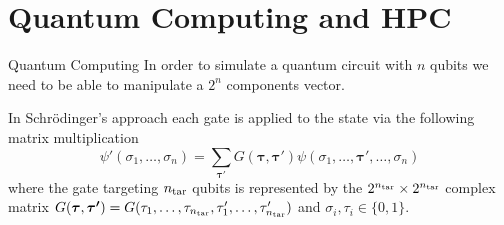 \documentclass[11p,aspectratio=169]{beamer}
\begin{document}
\section{Quantum Computing and HPC}

\begin{frame}{Quantum Computing}
    In order to simulate a quantum circuit with $n$ qubits we need to be able to manipulate a $2^n$ components
    vector.

    In Schr\"odinger's approach each gate is applied to the state via the following matrix multiplication
    \begin{equation}\label{eq:gateapplication}
        \psi'(\sigma_1, \ldots, \sigma_n) = \sum _{\boldsymbol{\tau'}} G(\boldsymbol{\tau}, \boldsymbol{\tau'})\psi(\sigma_1,\ldots,\boldsymbol{\tau'},\ldots,\sigma_n)
    \end{equation}
    where the gate targeting $n_{\rm tar}$ qubits is represented by the $2^{n_{\rm
    tar}}\times2^{n_{\rm tar}}$ complex matrix
    $G(\boldsymbol{\tau},\boldsymbol{\tau'})=G(\tau_1,\ldots,\tau_{n_{\rm
    tar}},\tau_1',\ldots,\tau_{n_{\rm tar}}')$ and $\sigma _i, \tau _i\in
    \{0,1\}$.
\end{frame}
\end{document}

